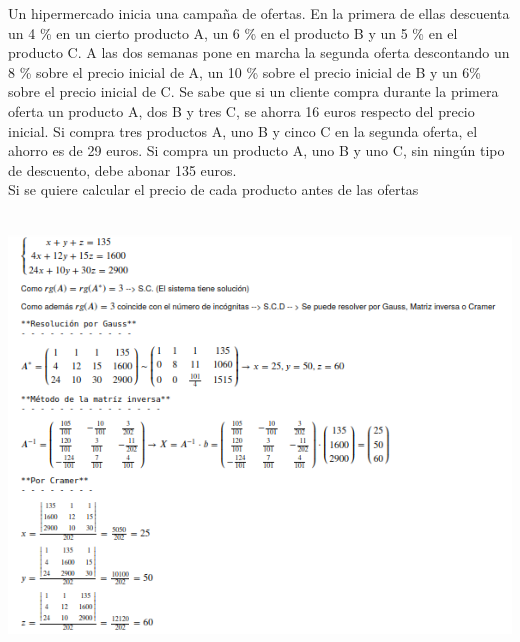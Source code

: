 \documentclass[addpoints,spanish, 12pt,a4paper]{exam}
\begin{document}
\begin{questions}
\question Un hipermercado inicia una campaña de ofertas. En la primera de
ellas descuenta un 4 \% en un cierto producto A, un 6 \% en el producto B y un 5 \% en el producto
C. A las dos semanas pone en marcha la segunda oferta descontando un 8 \% sobre el precio inicial
de A, un 10 \% sobre el precio inicial de B y un 6\% sobre el precio inicial de C.
Se sabe que si un cliente compra durante la primera oferta un producto A, dos B y tres C, se
ahorra 16 euros respecto del precio inicial. Si compra tres productos A, uno B y cinco C en la
segunda oferta, el ahorro es de 29 euros. Si compra un producto A, uno B y uno C, sin ningún
tipo de descuento, debe abonar 135 euros.\\
Si se quiere calcular el precio de cada producto antes de las ofertas

\begin{solution}\\
\includegraphics[scale=0.8]{sis1}
\end{solution}


\end{questions}
\end{document}
